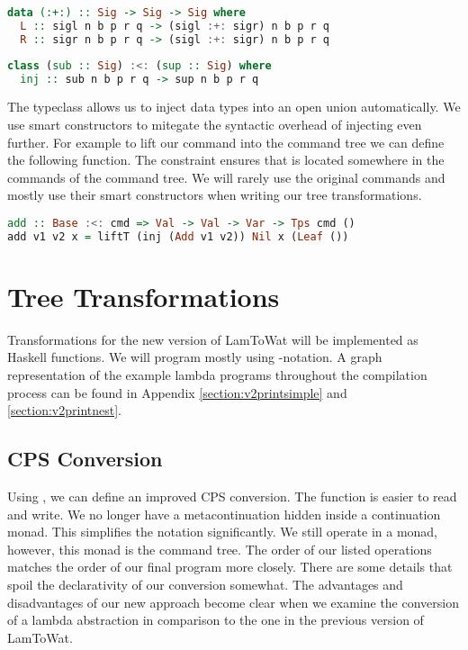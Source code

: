 \begin{lstlisting}[language=Haskell]
data (:+:) :: Sig -> Sig -> Sig where
  L :: sigl n b p r q -> (sigl :+: sigr) n b p r q
  R :: sigr n b p r q -> (sigl :+: sigr) n b p r q
\end{lstlisting}

\begin{lstlisting}[language=Haskell]
class (sub :: Sig) :<: (sup :: Sig) where
  inj :: sub n b p r q -> sup n b p r q
\end{lstlisting}

The typeclass \icode{:<:} allows us to inject data types into an open union automatically. We use smart constructors to mitegate the syntactic overhead of injecting \autocite{DBLP:conf/popl/LiangHJ95} even further. For example to lift our  command into the command tree we can define the following function. The constraint  ensures that  is located somewhere in the commands of the command tree. We will rarely use the original commands and mostly use their smart constructors when writing our tree transformations.

\begin{lstlisting}[language=Haskell]
add :: Base :<: cmd => Val -> Val -> Var -> Tps cmd ()
add v1 v2 x = liftT (inj (Add v1 v2)) Nil x (Leaf ())
\end{lstlisting}

\section{\label{section:treensforms}Tree Transformations}
Transformations for the new version of LamToWat will be implemented as Haskell functions. We will program mostly using -notation. A graph representation of the example lambda programs throughout the compilation process can be found in Appendix \ref{section:v2printsimple} and \ref{section:v2printnest}.

\subsection{\label{subsection:cpsconvert2}CPS Conversion}
Using , we can define an improved CPS conversion. The function is easier to read and write. We no longer have a metacontinuation hidden inside a continuation monad. This simplifies the notation significantly. We still operate in a monad, however, this monad is the command tree. The order of our listed operations matches the order of our final program more closely. There are some details that spoil the declarativity of our conversion somewhat. The advantages and disadvantages of our new approach become clear when we examine the conversion of a lambda abstraction in comparison to the one in the previous version of LamToWat.

